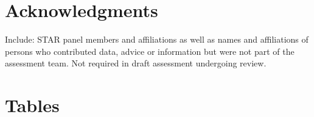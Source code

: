 \documentclass[12pt,]{article}
\begin{document}
\section{Acknowledgments}\label{acknowledgments}

Include: STAR panel members and affiliations as well as names and
affiliations of persons who contributed data, advice or information but
were not part of the assessment team. Not required in draft assessment
undergoing review.

\newpage

\FloatBarrier

\section{Tables}\label{tables}

\FloatBarrier

\FloatBarrier
\end{document}
